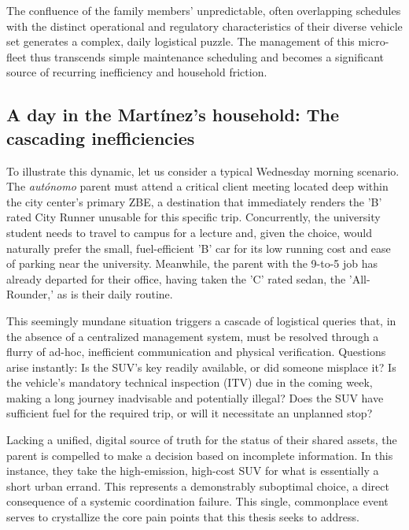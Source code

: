 The confluence of the family members' unpredictable, often overlapping schedules with the distinct operational and regulatory characteristics of their diverse vehicle set generates a complex, daily logistical puzzle. The management of this micro-fleet thus transcends simple maintenance scheduling and becomes a significant source of recurring inefficiency and household friction.

\subsection{A day in the Martínez's household: The cascading inefficiencies}

To illustrate this dynamic, let us consider a typical Wednesday morning scenario. The \textit{autónomo} parent must attend a critical client meeting located deep within the city center's primary ZBE, a destination that immediately renders the 'B' rated City Runner unusable for this specific trip. Concurrently, the university student needs to travel to campus for a lecture and, given the choice, would naturally prefer the small, fuel-efficient 'B' car for its low running cost and ease of parking near the university. Meanwhile, the parent with the 9-to-5 job has already departed for their office, having taken the 'C' rated sedan, the 'All-Rounder,' as is their daily routine.

\textgap

This seemingly mundane situation triggers a cascade of logistical queries that, in the absence of a centralized management system, must be resolved through a flurry of ad-hoc, inefficient communication and physical verification. Questions arise instantly: Is the SUV's key readily available, or did someone misplace it? Is the vehicle's mandatory technical inspection (ITV) due in the coming week, making a long journey inadvisable and potentially illegal? Does the SUV have sufficient fuel for the required trip, or will it necessitate an unplanned stop?

\textgap

Lacking a unified, digital source of truth for the status of their shared assets, the parent is compelled to make a decision based on incomplete information. In this instance, they take the high-emission, high-cost SUV for what is essentially a short urban errand. This represents a demonstrably suboptimal choice, a direct consequence of a systemic coordination failure. This single, commonplace event serves to crystallize the core pain points that this thesis seeks to address.

